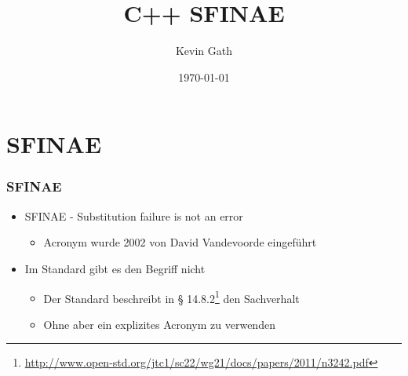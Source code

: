 \documentclass{beamer}
\title{C++ SFINAE}
\author{Kevin Gath}
\date{\today}
\begin{document}
\begin{frame}
\titlepage
\end{frame} 



\section{SFINAE} 
\begin{frame}
\frametitle{SFINAE} 
\begin{itemize}

\item SFINAE - \glqq{}Substitution failure is not an error\grqq
\begin{itemize}
\item Acronym wurde 2002 von David Vandevoorde eingeführt
\end{itemize}

\item Im Standard gibt es den Begriff nicht
\begin{itemize}
\item Der Standard beschreibt in § 14.8.2\footnote{\url{http://www.open-std.org/jtc1/sc22/wg21/docs/papers/2011/n3242.pdf}} den Sachverhalt
\item Ohne aber ein explizites Acronym zu verwenden
\end{itemize}

\end{itemize}

\end{frame}


\end{document}
